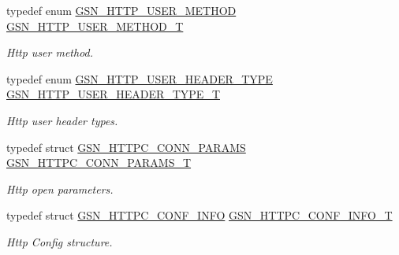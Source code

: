 \begin{DoxyCompactItemize}
$$typedef enum \hyperlink{a00665_ga23245efd9f2c5fead55d4b1f075bd6bf}{GSN\_\-HTTP\_\-USER\_\-METHOD} \hyperlink{a00665_ga19c754176c7cf6f41749aa60c125ee7e}{GSN\_\-HTTP\_\-USER\_\-METHOD\_\-T}
\begin{DoxyCompactList}\small\item\em Http user method. \end{DoxyCompactList}\item 
typedef enum \hyperlink{a00665_ga46b2de5d0afbd35d93a0426f601866d9}{GSN\_\-HTTP\_\-USER\_\-HEADER\_\-TYPE} \hyperlink{a00665_gacdf2ed5f026ce7b549a8151c0a5f0129}{GSN\_\-HTTP\_\-USER\_\-HEADER\_\-TYPE\_\-T}
\begin{DoxyCompactList}\small\item\em Http user header types. \end{DoxyCompactList}\item 
typedef struct \hyperlink{a00094}{GSN\_\-HTTPC\_\-CONN\_\-PARAMS} \hyperlink{a00665_ga5e3ebb30a4f8cfd9e99f04e17839d148}{GSN\_\-HTTPC\_\-CONN\_\-PARAMS\_\-T}
\begin{DoxyCompactList}\small\item\em Http open parameters. \end{DoxyCompactList}\item 
typedef struct \hyperlink{a00093}{GSN\_\-HTTPC\_\-CONF\_\-INFO} \hyperlink{a00665_gaaf13b52fc631f1baf542db4a4403369c}{GSN\_\-HTTPC\_\-CONF\_\-INFO\_\-T}
\begin{DoxyCompactList}\small\item\em Http Config structure. \end{DoxyCompactList}\end{DoxyCompactItemize}
